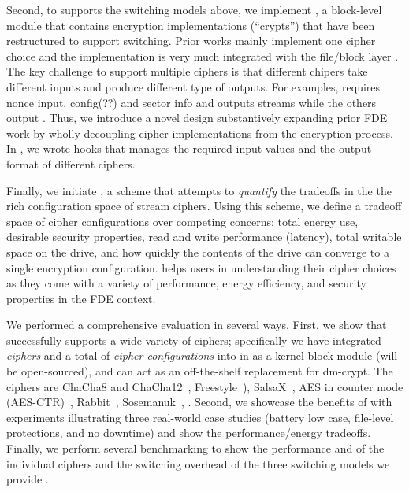 Second, to supports the switching models above, we implement \sysB, a
block-level module that contains encryption implementations (``crypts'')
that have been restructured to support switching.  Prior works mainly
implement one cipher choice and the implementation is very much integrated
with the file/block layer \cite{strongbox, any-other-works-like-this?}.
The key challenge to support multiple ciphers is that different chipers
take different inputs and produce different type of outputs.  For
examples, \encA requires nonce input, \encB config(??\xxx) and \encC
sector info and \encC outputs streams while the others output \xxx.  Thus,
we introduce a novel design substantively expanding prior FDE work by
wholly decoupling cipher implementations from the encryption process.  In
\sysB, we wrote hooks that manages the required input values and the
output format of different ciphers.


Finally, we initiate \sysC, a scheme that attempts to {\em quantify} the
tradeoffs in the the rich configuration space of stream ciphers.  Using
this scheme, we define a tradeoff space of cipher configurations over
competing concerns: total energy use, desirable security properties, read
and write performance (latency), total writable space on the drive, and
how quickly the contents of the drive can converge to a single encryption
configuration.  \sysC helps users in understanding their cipher choices as
they come with a variety of performance, energy efficiency, and security
properties in the FDE context.


We performed a comprehensive evaluation in several ways.
%
First, we show that \sys successfully supports a wide variety of ciphers;
specifically we have integrated {\em \numCiphers ciphers} and a total of
{\em \numConfigs cipher configurations} into \sys in \locTotal as a kernel
block module (will be open-sourced), and can act as an off-the-shelf
replacement for dm-crypt.  The ciphers are ChaCha8 and
ChaCha12~\cite{ChaCha20}, Freestyle~\cite{Freestyle}),
SalsaX~\cite{SalsaX}, AES in counter mode (AES-CTR)~\cite{AESCTR},
Rabbit~\cite{Rabbit}, Sosemanuk~\cite{Sosemanuk}, \xxx.
%
Second, we showcase the benefits of \sys with experiments illustrating
three real-world case studies (battery low case, file-level protections,
and no downtime) and show the performance/energy tradeoffs.
%
Finally, we perform several benchmarking to show the performance and \xxx
of the individual ciphers and the switching overhead of the three
switching models we provide .


